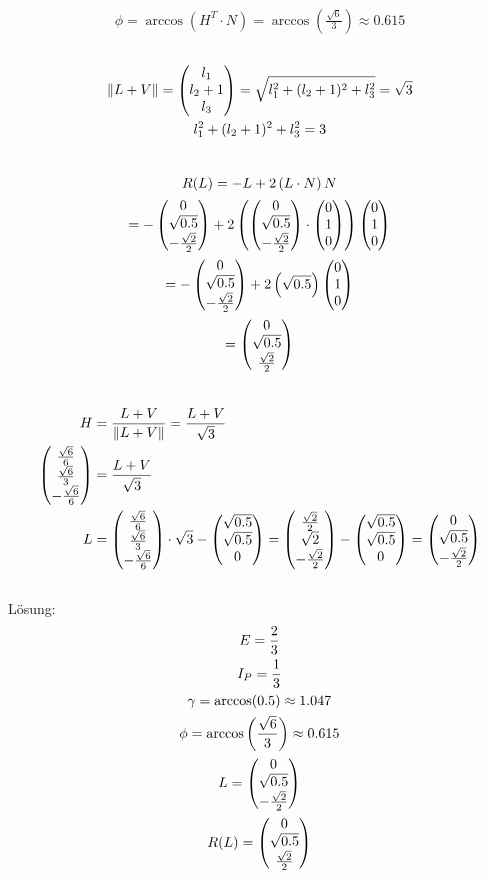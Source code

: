 \documentclass[a4paper,10pt,DIV=14]{article}
\begin{document}
\\
\begin{gather*}
\phi = \arccos(H^T \cdot N) = \arccos\left(\frac{\sqrt{6}}{3}\right) \approx 0.615
\end{gather*}
\\
\begin{gather*}
\lVert L+V \rVert = \begin{pmatrix} l_1 \\ l_2+1 \\ l_3 \end{pmatrix} = \sqrt{l_1^2 + (l_2+1)^2 + l_3^2} = \sqrt{3} \\
l_1^2 + (l_2+1)^2 + l_3^2 = 3
\end{gather*}
\\
\begin{gather*}
R(L) = - L + 2 \left(L \cdot N \right) N \\
= - \begin{pmatrix} 0 \\ \sqrt{0.5} \\ -\frac{\sqrt{2}}{2} \end{pmatrix} + 2 \left(\begin{pmatrix} 0 \\ \sqrt{0.5} \\ -\frac{\sqrt{2}}{2} \end{pmatrix} \cdot \begin{pmatrix} 0 \\ 1 \\ 0 \end{pmatrix} \right) \begin{pmatrix} 0 \\ 1 \\ 0 \end{pmatrix} \\
= - \begin{pmatrix} 0 \\ \sqrt{0.5} \\ -\frac{\sqrt{2}}{2} \end{pmatrix} + 2 \left( \sqrt{0.5} \right) \begin{pmatrix} 0 \\ 1 \\ 0 \end{pmatrix} \\ 
= \begin{pmatrix} 0 \\ \sqrt{0.5} \\ \frac{\sqrt{2}}{2} \end{pmatrix}
\end{gather*}
\\
\begin{align*}
H &= \frac{L+V}{\lVert L+V \rVert} = \frac{L+V}{\sqrt{3}} \\
\begin{pmatrix} \frac{\sqrt{6}}{6} \\ \frac{\sqrt{6}}{3} \\ -\frac{\sqrt{6}}{6} \end{pmatrix} &= \frac{L+V}{\sqrt{3}} \\
L &= \begin{pmatrix} \frac{\sqrt{6}}{6} \\ \frac{\sqrt{6}}{3} \\ -\frac{\sqrt{6}}{6} \end{pmatrix} \cdot \sqrt{3} - \begin{pmatrix} \sqrt{0.5} \\ \sqrt{0.5} \\ 0 \end{pmatrix} = \begin{pmatrix} \frac{\sqrt{2}}{2} \\ \sqrt{2} \\ -\frac{\sqrt{2}}{2} \end{pmatrix} - \begin{pmatrix} \sqrt{0.5} \\ \sqrt{0.5} \\ 0 \end{pmatrix} = \begin{pmatrix} 0 \\ \sqrt{0.5} \\ -\frac{\sqrt{2}}{2} \end{pmatrix}
\end{align*}
\\
Lösung:
\begin{gather*}
E = \frac{2}{3} \\
I_P = \frac{1}{3}\\
\gamma = \arccos(0.5) \approx 1.047\\
\phi = \arccos\left(\frac{\sqrt{6}}{3}\right) \approx 0.615 \\
L =  \begin{pmatrix} 0 \\ \sqrt{0.5} \\ -\frac{\sqrt{2}}{2} \end{pmatrix} \\
R(L) = \begin{pmatrix} 0 \\ \sqrt{0.5} \\ \frac{\sqrt{2}}{2} \end{pmatrix}\\
\end{gather*}
\end{document}
